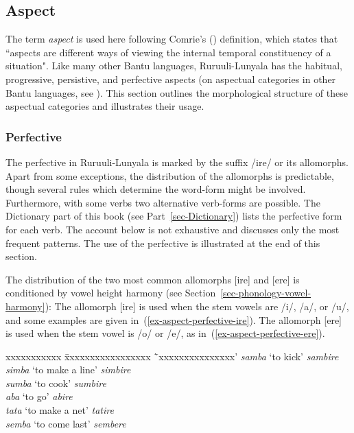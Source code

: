 \subsection{Aspect}\label{sec-aspect}
\largerpage[-1]
The term \textit{aspect} is used here following Comrie's (\citeyear[3]{Comrie1985Tense}) definition, which states that ``aspects are different ways of viewing the internal temporal constituency of a situation". 
Like many other Bantu languages, Ru\-ruu\-li\hyp{}Lu\-nya\-la has the habitual, progressive, persistive, and perfective aspects (on aspectual categories in other Bantu languages, see \citealt{Nurse2008Tense}). 
This section outlines the morphological structure of these aspectual categories and illustrates their usage.


\subsubsection{Perfective}\label{sec-aspect-perfective}

The perfective in Ru\-ruu\-li\hyp{}Lu\-nya\-la  is marked by the suffix /ire/ or its allomorphs. 
Apart from some exceptions, the distribution of the allomorphs is predictable, though several rules which determine the  word-form might be involved. 
Furthermore, with some verbs two alternative verb-forms are possible. 
The Dictionary part of this book (see Part~\ref{sec-Dictionary}) lists the perfective form for each verb.  
The account below is not exhaustive and discusses only the most frequent patterns. 
The use of the perfective is illustrated at the end of this section.  

The distribution of the two most common allomorphs [ire] and [ere] is conditioned by vowel height harmony (see Section~\ref{sec-phonology-vowel-harmony}): 
The allomorph [ire] is used when the stem vowels are /i/, /a/, or /u/, and some examples are given in~(\ref{ex-aspect-perfective-ire}). 
The allomorph [ere] is used when the stem vowel is /o/ or /e/, as in~(\ref{ex-aspect-perfective-ere}).

\ea \label{ex-aspect-perfective-ire}
\begin{tabbing}
xxxxxxxxxxx \= xxxxxxxxxxxxxxxxx \=`xxxxxxxxxxxxxxx'\kill
    \textit{samba}	\>`to kick' \>	\textit{sambire}\\
    \textit{simba}	\>`to make a line'\>	\textit{simbire}\\
    \textit{sumba}\>	`to cook'\>	\textit{sumbire}\\
    \textit{aba}		\>`to go'\> \textit{abire}\\
    \textit{tata}	 	\>`to make a net'\> \textit{tatire}\\
    \textit{semba}	\> `to come last'\> \textit{sembere}
\end{tabbing}
\z

